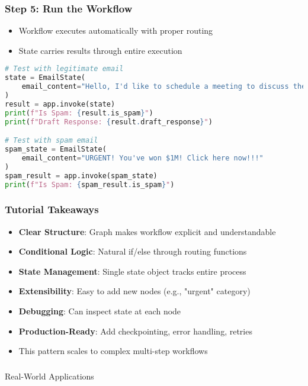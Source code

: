 \begin{frame}[fragile]\frametitle{Step 5: Run the Workflow}

      \begin{itemize}
        \item Workflow executes automatically with proper routing
        \item State carries results through entire execution
      \end{itemize}
	  
      \begin{lstlisting}[language=Python, basicstyle=\small]
# Test with legitimate email
state = EmailState(
    email_content="Hello, I'd like to schedule a meeting to discuss the project timeline."
)
result = app.invoke(state)
print(f"Is Spam: {result.is_spam}")
print(f"Draft Response: {result.draft_response}")

# Test with spam email
spam_state = EmailState(
    email_content="URGENT! You've won $1M! Click here now!!!"
)
spam_result = app.invoke(spam_state)
print(f"Is Spam: {spam_result.is_spam}")
      \end{lstlisting}
      

\end{frame}

\begin{frame}[fragile]\frametitle{Tutorial Takeaways}
      \begin{itemize}
        \item \textbf{Clear Structure}: Graph makes workflow explicit and understandable
        \item \textbf{Conditional Logic}: Natural if/else through routing functions
        \item \textbf{State Management}: Single state object tracks entire process
        \item \textbf{Extensibility}: Easy to add new nodes (e.g., "urgent" category)
        \item \textbf{Debugging}: Can inspect state at each node
        \item \textbf{Production-Ready}: Add checkpointing, error handling, retries
        \item This pattern scales to complex multi-step workflows
      \end{itemize}
\end{frame}

\begin{frame}[fragile]\frametitle{}
\begin{center}
{\Large Real-World Applications}
\end{center}
\end{frame}

